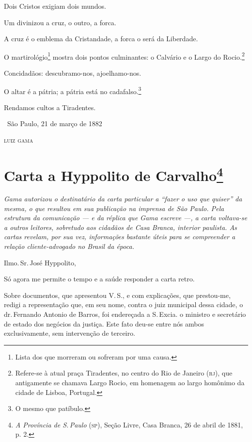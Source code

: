 Dois Cristos exigiam dois mundos.

Um divinizou a cruz, o outro, a forca.

A cruz é o emblema da Cristandade, a forca o será da Liberdade.

O martirológio\footnote{Lista dos que morreram ou sofreram por uma
  causa.} mostra dois pontos culminantes: o Calvário e o Largo do
Rocio.\footnote{Refere-se à atual praça Tiradentes, no centro do Rio
  de Janeiro (\textsc{rj}), que antigamente se chamava Largo Rocio, em
  homenagem ao largo homônimo da cidade de Lisboa, Portugal.}

Concidadãos: descubramo-nos, ajoelhamo-nos.

O altar é a pátria; a pátria está no cadafalso.\footnote{O mesmo que
  patíbulo.}

Rendamos cultos a Tiradentes.

\medskip

\hfill\ São Paulo, 21 de março de 1882

\hfill\textsc{luiz gama}

\chapter{Carta a Hyppolito de Carvalho\footnote{\emph{A
  Província de S.\,Paulo} (\textsc{sp}), Seção Livre, Casa Branca, 26 de abril de 1881, p.
  2.}}

\begin{resumo}
\emph{Gama autorizou o destinatário da carta particular a ``fazer o uso que quiser''
da mesma, o que resultou em sua publicação na
imprensa de São Paulo. Pela estrutura da comunicação --- e da réplica que
Gama escreve ---, a carta voltava-se a outros
leitores, sobretudo aos cidadãos de Casa Branca, interior paulista. As
cartas revelam, por sua vez, informações bastante úteis para se
compreender a relação cliente-advogado no Brasil da época.}
\end{resumo}

Ilmo.\,Sr.\,José Hyppolito,

Só agora me permite o tempo e a saúde responder a carta retro.

Sobre documentos, que
apresentou V.\,S., e com explicações, que prestou-me, redigi a
representação que, em seu nome, contra o juiz municipal dessa cidade, o
dr.\,Fernando Antonio de Barros, foi endereçada a S.\,Excia. o ministro e
secretário de estado dos negócios da justiça. Este fato deu-se entre nós
ambos exclusivamente, sem intervenção de terceiro.

